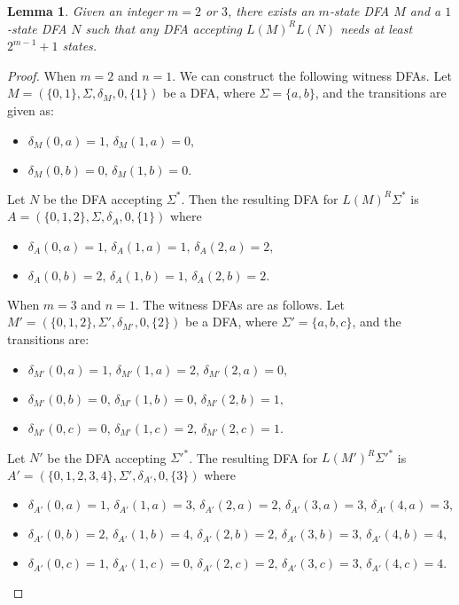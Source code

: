 \documentclass[10pt]{article}
\newtheorem{lemma}{Lemma}
\begin{document}
\begin{lemma}
\label{L_1^R L_2 lower bound m=2 or 3 n=1}Given an integer $m=2$ or
$3$, there exists an $m$-state DFA $M$ and a $1$-state DFA $N$ such
that any DFA accepting $L(M)^RL(N)$ needs at least $2^{m-1}+1$
states.
\end{lemma}

\begin{proof}
When $m=2$ and $n = 1$. We can construct the following witness DFAs.
Let $M=(\{0, 1\},\Sigma , \delta_M , 0, \{1\} )$ be a DFA, where
$\Sigma = \{a,b\}$, and the transitions are given as:
\begin{itemize}
\item $\delta_M(0, a) = 1 \mbox{, } \delta_M(1, a) = 0,$
\item $\delta_M(0, b) = 0 \mbox{, } \delta_M(1, b) = 0.$
\end{itemize}
Let $N$ be the DFA accepting $\Sigma^*$. Then the resulting DFA for
$L(M)^R \Sigma^*$ is $A=(\{0, 1, 2\},\Sigma , \delta_A , 0, \{1\} )$
where
\begin{itemize}
\item $\delta_A(0, a) = 1 \mbox{, } \delta_A(1, a) = 1\mbox{, }\delta_A(2, a) = 2\mbox{, }$
\item $\delta_A(0, b) = 2 \mbox{, } \delta_A(1, b) = 1\mbox{, }\delta_A(2, b) = 2.$
\end{itemize}

When $m=3$ and $n = 1$. The witness DFAs are as follows. Let
$M'=(\{0, 1, 2\},\Sigma' , \delta_{M'} , 0, \{2\} )$ be a DFA, where
$\Sigma' = \{a,b,c\}$, and the transitions are:
\begin{itemize}
\item $\delta_{M'}(0, a) = 1 \mbox{, } \delta_{M'}(1, a) = 2\mbox{, }\delta_{M'}(2, a) = 0\mbox{, }$
\item $\delta_{M'}(0, b) = 0 \mbox{, } \delta_{M'}(1, b) = 0\mbox{, }\delta_{M'}(2, b) = 1\mbox{, }$
\item $\delta_{M'}(0, c) = 0 \mbox{, } \delta_{M'}(1, c) = 2\mbox{, }\delta_{M'}(2, c) = 1\mbox{. }$
\end{itemize}
Let $N'$ be the DFA accepting $\Sigma'^*$. The resulting DFA for
$L(M')^R \Sigma'^*$ is $A'=(\{0, 1, 2, 3, 4\},\Sigma' , \delta_{A'}
, 0, \{3\} )$ where
\begin{itemize}
\item $\delta_{A'}(0, a) = 1 \mbox{, } \delta_{A'}(1, a) = 3\mbox{, }\delta_{A'}(2, a) = 2\mbox{, }\delta_{A'}(3, a) = 3\mbox{, }\delta_{A'}(4, a) = 3\mbox{, }$
\item $\delta_{A'}(0, b) = 2 \mbox{, } \delta_{A'}(1, b) = 4\mbox{, }\delta_{A'}(2, b) = 2\mbox{, }\delta_{A'}(3, b) = 3\mbox{, }\delta_{A'}(4, b) = 4\mbox{, }$
\item $\delta_{A'}(0, c) = 1 \mbox{, } \delta_{A'}(1, c) = 0\mbox{, }\delta_{A'}(2, c) = 2\mbox{, }\delta_{A'}(3, c) = 3\mbox{, }\delta_{A'}(4, c) = 4\mbox{. }$
\end{itemize}
\end{proof}
\end{document}
